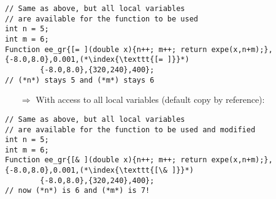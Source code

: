 \documentclass[10pt]{article}
\begin{document}
\begin{lstlisting}
// Same as above, but all local variables
// are available for the function to be used
int n = 5;
int m = 6;
Function ee_gr{[= ](double x){n++; m++; return expe(x,n+m);},{-8.0,8.0},0.001,(*\index{\texttt{[= ]}}*)
        {-8.0,8.0},{320,240},400};
// (*n*) stays 5 and (*m*) stays 6 
 \end{lstlisting}
\begin{enumerate}
\item[$\Rightarrow$] With access to all local variables (default copy by reference):
\end{enumerate}
\begin{lstlisting}
// Same as above, but all local variables
// are available for the function to be used and modified
int n = 5;
int m = 6;
Function ee_gr{[& ](double x){n++; m++; return expe(x,n+m);},{-8.0,8.0},0.001,(*\index{\texttt{[\& ]}}*)
        {-8.0,8.0},{320,240},400};
// now (*n*) is 6 and (*m*) is 7!
 \end{lstlisting}
%
%
\end{document}

